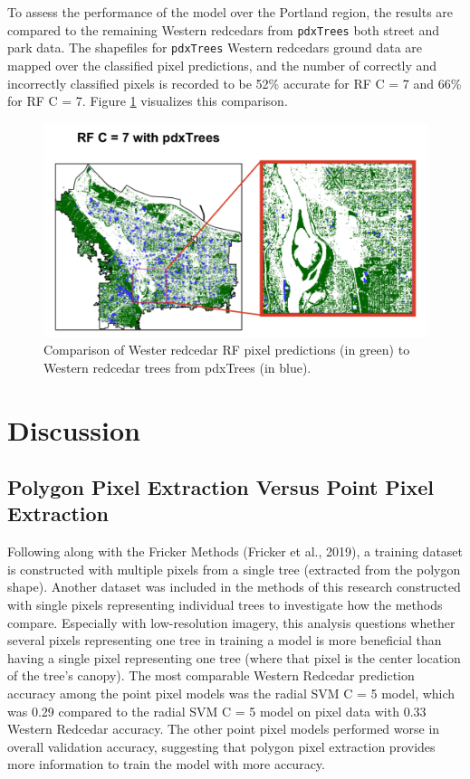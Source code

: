 \documentclass[12pt,twoside]{reedthesis}
\begin{document}
To assess the performance of the model over the Portland region, the results are compared to the remaining Western redcedars from \texttt{pdxTrees} both street and park data. The shapefiles for \texttt{pdxTrees} Western redcedars ground data are mapped over the classified pixel predictions, and the number of correctly and incorrectly classified pixels is recorded to be 52\% accurate for RF C = 7 and 66\% for RF C = 7. Figure \ref{fig:resultsToStreet} visualizes this comparison.
\begin{figure}

{\centering \includegraphics[width=1\linewidth]{figure/resultsToStreet} 

}

\caption{Comparison of Wester redcedar RF pixel predictions (in green) to Western redcedar trees from pdxTrees (in blue).}\label{fig:resultsToStreet}
\end{figure}
\hypertarget{discussion}{%
\chapter{Discussion}\label{discussion}}

\hypertarget{polygon-pixel-extraction-versus-point-pixel-extraction}{%
\section{Polygon Pixel Extraction Versus Point Pixel Extraction}\label{polygon-pixel-extraction-versus-point-pixel-extraction}}

Following along with the Fricker Methods (Fricker et al., 2019), a training dataset is constructed with multiple pixels from a single tree (extracted from the polygon shape). Another dataset was included in the methods of this research constructed with single pixels representing individual trees to investigate how the methods compare. Especially with low-resolution imagery, this analysis questions whether several pixels representing one tree in training a model is more beneficial than having a single pixel representing one tree (where that pixel is the center location of the tree's canopy). The most comparable Western Redcedar prediction accuracy among the point pixel models was the radial SVM C = 5 model, which was 0.29 compared to the radial SVM C = 5 model on pixel data with 0.33 Western Redcedar accuracy. The other point pixel models performed worse in overall validation accuracy, suggesting that polygon pixel extraction provides more information to train the model with more accuracy.
\end{document}
